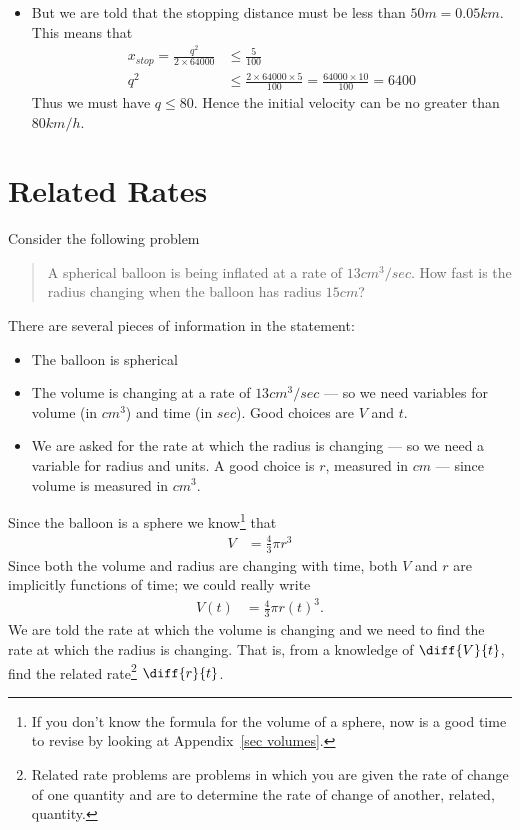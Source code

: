\begin{eg}
\begin{itemize}
\item But we are told that the stopping distance must be less than $50m = 0.05km$. This
means that
\begin{align*}
  x_{stop} = \frac{q^2}{2 \times 64000} &\leq \frac{5}{100}  \\
    q^2 &\leq \frac{2 \times 64000 \times 5}{100} = \frac{64000 \times 10}{100} = 6400
\end{align*}
Thus we must have $q \leq 80$. Hence the initial velocity can be no greater than $80km/h$.
\end{itemize}

\end{eg}

\section{Related Rates}\label{sec rrates}

Consider the following problem
\begin{quote}
 A spherical balloon is being inflated at a rate of $13cm^3/sec$. How fast is
the radius changing when the balloon has radius $15cm$?
\end{quote}
There are several pieces of information in the statement:
\begin{itemize}
 \item The balloon is spherical
 \item The volume is changing at a rate of $13cm^3/sec$ --- so we need variables
for volume (in $cm^3$) and time (in $sec$). Good choices are $V$ and $t$.
\item We are asked for the rate at which the radius is changing --- so we need
a variable for radius and units. A good choice is $r$, measured in $cm$ ---
since volume is measured in $cm^3$.
\end{itemize}
Since the balloon is a sphere we know\footnote{If you don't know the formula
for the volume of a sphere, now is a good time to revise by looking at
Appendix~\ref{sec volumes}.} that
\begin{align*}
  V &= \frac{4}{3} \pi r^3
\end{align*}
Since both the volume and radius are changing with time, both $V$ and $r$ are
implicitly functions of time; we could really write
\begin{align*}
  V(t) &= \frac{4}{3}\pi r(t)^3.
\end{align*}
We are told the rate at which the volume is changing and we need to find the
rate at which the radius is changing. That is, from a knowledge of
$\diff{V}{t}$, find the related rate\footnote{Related rate problems are problems in which
you are given the rate of change of one quantity and are to determine the rate of
change of another, related, quantity.} $\diff{r}{t}$.

